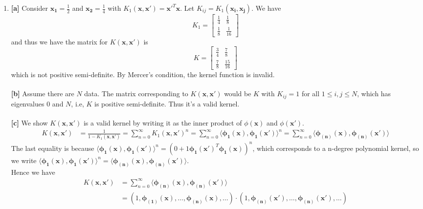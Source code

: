 \documentclass{article}
\begin{document}
\begin{CJK*}{UTF8}{bsmi}
\begin{normalsize}
\begin{enumerate}[label=\textbf{\arabic*}.]
        \item \textbf{[a]} Consider $\mathbf{x_1} = \frac{1}{2}$ and $\mathbf{x_2} = \frac{1}{4}$ with $K_1(\mathbf{x}, \mathbf{x'}) = \mathbf{x'}^T\mathbf{x}$. Let $K_{ij} = K_1(\mathbf{x_i}, \mathbf{x_j})$. We have
        \[ K_1 = \begin{bmatrix} \frac{1}{4} & \frac{1}{8}\\ \frac{1}{8} & \frac{1}{16} \end{bmatrix} \]
        and thus we have the matrix for $K(\mathbf{x}, \mathbf{x'})$ is
        \[ K = \begin{bmatrix} \frac{3}{4} & \frac{7}{8}\\ \frac{7}{8} & \frac{15}{16} \end{bmatrix} \]
        which is not positive semi-definite. By Mercer's condition, the kernel function is invalid.\\\\
        \textbf{[b]} Assume there are $N$ data. The matrix corresponding to $K(\mathbf{x}, \mathbf{x'})$ would be $K$ with $K_{ij} = 1$ for all $1 \le i, j \le N$, which has eigenvalues $0$ and $N$, i.e, $K$ is positive semi-definite. Thus it's a valid kernel.\\\\
        \textbf{[c]} We show $K(\mathbf{x}, \mathbf{x'})$ is a valid kernel by writing it as the inner product of $\phi(\mathbf{x})$ and $\phi(\mathbf{x'})$.
        \begin{align*}
            K(\mathbf{x}, \mathbf{x'}) &=
            \frac{1}{1-K_1(\mathbf{x}, \mathbf{x'})} = \sum_{n=0}^\infty K_1(\mathbf{x}, \mathbf{x'})^n = \sum_{n=0}^\infty \langle {\mathbf{\phi_1(x)}, \mathbf{\phi_1(x')}\rangle}^n = \sum_{n=0}^\infty \langle \mathbf{\phi_{(n)}(x)}, \mathbf{\phi_{(n)}(x')} \rangle
        \end{align*}
        The last equality is because $\langle {\mathbf{\phi_1(x)}, \mathbf{\phi_1(x')}\rangle}^n = (0 + 1\mathbf{\phi_{1}(x')}^T \mathbf{\phi_{1}(x)})^n$, which corresponds to a n-degree polynomial kernel, so we write ${\langle \mathbf{\phi_1(x)}, \mathbf{\phi_1(x')} \rangle}^n = \langle \mathbf{\phi_{(n)}(x)}, \mathbf{\phi_{(n)}(x')} \rangle$.\\
        Hence we have
        \begin{align*}
            K(\mathbf{x}, \mathbf{x'})
            &= \sum_{n=0}^\infty \langle \mathbf{\phi_{(n)}(x)}, \mathbf{\phi_{(n)}(x')} \rangle\\
            &= (1, \mathbf{\phi_{(1)}(x)},\dots, \mathbf{\phi_{(n)}(x)},\dots)\cdot (1, \mathbf{\phi_{(n)}(x')},\dots, \mathbf{\phi_{(n)}(x')},\dots)\\

\end{align*}
\end{enumerate}
\end{normalsize}
\end{CJK*}
\end{document}
